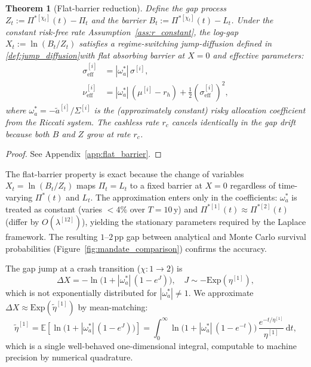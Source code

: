 \documentclass[11pt,a4paper]{article}
\numberwithin{equation}{section}
\newtheorem{theorem}{Theorem}[section]
\newcommand{\E}{\mathbb{E}}
\newcommand{\dd}{\mathrm{d}}
\begin{document}
\begin{theorem}[Flat-barrier reduction]\label{thm:flat_barrier}
Define the gap process $Z_t := \Pi^{*[\chi_t]}(t) - \Pi_t$ and the barrier $B_t := \Pi^{*[\chi_t]}(t) - L_t$. Under the constant risk-free rate Assumption~\ref{ass:r_constant}, the log-gap $X_t := \ln(B_t / Z_t)$ satisfies a regime-switching jump-diffusion defined in \ref{def:jump_diffusion}with flat absorbing barrier at $X = 0$ and effective parameters:
\begin{align}
\sigma^{[i]}_{\mathrm{eff}} &= |\omega^*_a|\, \sigma^{[i]}, \label{eq:sigma_eff}\\
\nu^{[i]}_{\mathrm{eff}} &= |\omega^*_a|\,(\mu^{[i]} - r_h) + \tfrac{1}{2}(\sigma^{[i]}_{\mathrm{eff}})^2, \label{eq:nu_eff}
\end{align}
where $\omega^*_a = -\tilde{a}^{[i]}/\Sigma^{[i]}$ is the (approximately constant) risky allocation coefficient from the Riccati system.  The cashless rate $r_c$ cancels identically in the gap drift because both $B$ and $Z$ grow at rate $r_c$.
\end{theorem}

\begin{proof}
See Appendix~\ref{app:flat_barrier}.
\end{proof}

The flat-barrier property is exact because the change of variables 
$X_t = \ln(B_t/Z_t)$ maps $\Pi_t = L_t$ to a fixed barrier at $X = 0$ 
regardless of time-varying $\Pi^*(t)$ and $L_t$. The approximation 
enters only in the coefficients: $\omega^*_a$ is treated as 
constant (varies $< 4\%$ over $T = 10$\,y) and 
$\Pi^{*[1]}(t) \approx \Pi^{*[2]}(t)$ (differ by $O(\lambda^{[12]})$), 
yielding the stationary parameters required by the Laplace framework. 
The resulting $1$--$2$\,pp gap between analytical and Monte Carlo 
survival probabilities (Figure~\ref{fig:mandate_comparison}) confirms 
the accuracy.


The gap jump at a crash transition ($\chi: 1\to 2$) is
\begin{equation}\label{eq:gap_jump}
\Delta X = -\ln\!\bigl(1 + |\omega^*_a|\,(1 - e^J)\bigr), \quad J \sim -\mathrm{Exp}(\eta^{[1]}),
\end{equation}
which is not exponentially distributed for $|\omega^*_a| \neq 1$.  We approximate $\Delta X \approx \mathrm{Exp}(\tilde\eta^{[1]})$ by mean-matching:
\begin{equation}\label{eq:eta_eff_quadrature}
\tilde\eta^{[1]} = \E\!\left[\ln\!\bigl(1 + |\omega^*_a|\,(1-e^J)\bigr)\right]
= \int_0^\infty \ln\!\bigl(1 + |\omega^*_a|\,(1-e^{-t})\bigr)\,\frac{e^{-t/\eta^{[1]}}}{\eta^{[1]}}\,\dd t,
\end{equation}
which is a single well-behaved one-dimensional integral, computable to machine precision by numerical quadrature.
\end{document}

